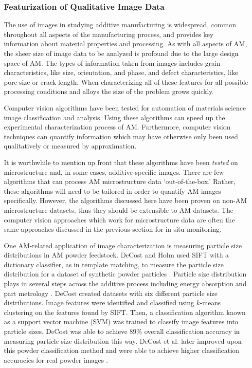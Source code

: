 \subsubsection{Featurization of Qualitative Image Data}
The use of images in studying additive manufacturing is widespread, common throughout all aspects of the manufacturing process, and provides key information about material properties and processing. As with all aspects of AM, the sheer size of image data to be analyzed is profound due to the large design space of AM. The types of information taken from images includes grain characteristics, like size, orientation, and phase, and defect characteristics, like pore size or crack length. When characterizing all of these features for all possible processing conditions and alloys the size of the problem grows quickly.

Computer vision algorithms have been tested for automation of materials science image classification and analysis. Using these algorithms can speed up the experimental characterization process of AM. Furthermore, computer vision techniques can quantify information which may have otherwise only been used qualitatively or measured by approximation. 

It is worthwhile to mention up front that these algorithms have been \textit{tested} on microstructure and, in some cases, additive-specific images. There are few algorithms that can process AM microstructure data `out-of-the-box.' Rather, these algorithms will need to be tailored in order to quantify AM images specifically. However, the algorithms discussed here have been proven on non-AM microstructure datasets, thus they should be extensible to AM datasets. The computer vision approaches which work for microstructure data are often the same approaches discussed in the previous section for in situ monitoring. 

One AM-related application of image characterization is measuring particle size distributions in AM powder feedstock. DeCost and Holm used SIFT with a dictionary classifier, as in template matching, to measure the particle size distribution for a dataset of synthetic powder particles \cite{DeCost2017a}. Particle size distribution plays in several steps across the additive process including energy absorption and part metrology \cite{Zhou2009, Boley2015, Boley2016}. DeCost created datasets with six different particle size distributions. Image features were identified and classified using $k$-means clustering on the features found by SIFT. Then, a classification algorithm known as a support vector machine (SVM) was trained to classify image features into particle sizes. DeCost was able to achieve $89$\% overall classification accuracy in measuring particle size distribution this way. DeCost et al. later improved upon this powder classification method and were able to achieve higher classification accuracies for real powder images \cite{DeCost2017}.

